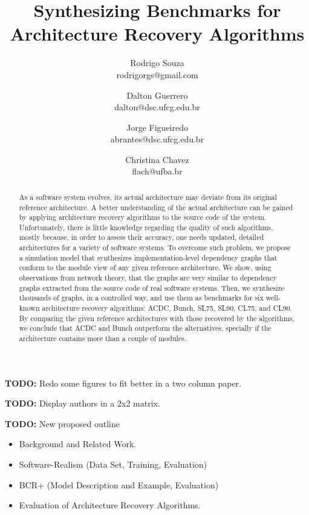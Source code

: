 \documentclass[11pt,twocolumn,a4paper,english]{article}
\title{
Synthesizing Benchmarks for Architecture Recovery Algorithms}
\author{Rodrigo Souza \\ rodrigorgs@gmail.com 
\and Dalton Guerrero \\ dalton@dsc.ufcg.edu.br
\and Jorge Figueiredo \\ abrantes@dsc.ufcg.edu.br
\and Christina Chavez \\ flach@ufba.br
}
\newcommand{\TODO}{\textbf{TODO:} }
\begin{document}
\sloppy
\maketitle

\tableofcontents
\vspace{1 em}

\TODO Redo some figures to fit better in a two column paper.

\TODO Display authors in a 2x2 matrix.


\TODO New proposed outline
\begin{itemize}
	\item Background and Related Work.

	\item Software-Realism (Data Set, Training, Evaluation)
	
	\item BCR+ (Model Description and Example, Evaluation)
	
	\item Evaluation of Architecture Recovery Algorithms.
	
\end{itemize}


\begin{abstract}
	As a software system evolves, its actual architecture may deviate from its original reference architecture. A better understanding of the actual architecture can be gained by applying architecture recovery algorithms to the source code of the system. Unfortunately, there is little knowledge regarding the quality of such algorithms, mostly because, in order to assess their accuracy, one needs updated, detailed architectures for a variety of software systems.
	To overcome such problem, we propose a simulation model that synthesizes implementation-level dependency graphs that conform to the module view of any given reference architecture. We show, using observations from network theory, that the graphs are very similar to dependency graphs extracted from the source code of real software systems. 
	Then, we synthesize thousands of graphs, in a controlled way, and use them as benchmarks for six well-known architecture recovery algorithms: ACDC, Bunch, SL75, SL90, CL75, and CL90. By comparing the given reference architectures with those recovered by the algorithms, we conclude that ACDC and Bunch outperform the alternatives, specially if the architecture contains more than a couple of modules.\end{abstract}
\end{document}
